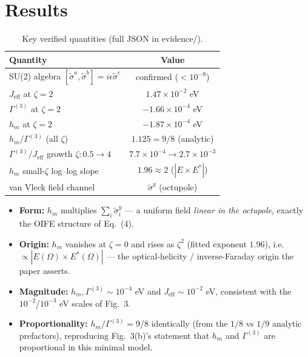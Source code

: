 \documentclass[aps,prb,twocolumn,superscriptaddress,floatfix]{revtex4-2}
\begin{document}
\section{Results}
\begin{table}[h]
\caption{Key verified quantities (full JSON in evidence/).}
\begin{ruledtabular}
\begin{tabular}{lc}
Quantity & Value\\\hline
SU(2) algebra $[\tilde\sigma^a,\tilde\sigma^b]{=}i\epsilon\tilde\sigma^c$ & confirmed ($<10^{-9}$)\\
$J_\mathrm{eff}$ at $\zeta{=}2$ & $1.47\times10^{-2}$ eV\\
$\Gamma^{(3)}$ at $\zeta{=}2$ & $-1.66\times10^{-4}$ eV\\
$h_m$ at $\zeta{=}2$ & $-1.87\times10^{-4}$ eV\\
$h_m/\Gamma^{(3)}$ (all $\zeta$) & $1.125=9/8$ (analytic)\\
$\Gamma^{(3)}/J_\mathrm{eff}$ growth $\zeta:0.5\!\to\!4$ & $7.7\!\times\!10^{-4}\!\to\!2.7\!\times\!10^{-3}$\\
$h_m$ small-$\zeta$ log--log slope & $1.96\approx2$ ($|E\times E^*|$)\\
van Vleck field channel & $\tilde\sigma^y$ (octupole)\\
\end{tabular}
\end{ruledtabular}
\end{table}

\begin{itemize}
\item \textbf{Form:} $h_m$ multiplies $\sum_i\tilde\sigma^y_i$ --- a uniform
field \emph{linear in the octupole}, exactly the OIFE structure of Eq.~(4).
\item \textbf{Origin:} $h_m$ vanishes at $\zeta{=}0$ and rises as $\zeta^2$
(fitted exponent $1.96$), i.e.\ $\propto|E(\Omega)\times E^*(\Omega)|$ ---
the optical-helicity / inverse-Faraday origin the paper asserts.
\item \textbf{Magnitude:} $h_m,\Gamma^{(3)}\sim10^{-4}$ eV and
$J_\mathrm{eff}\sim10^{-2}$ eV, consistent with the $10^{-2}$/$10^{-3}$ eV
scales of Fig.~3.
\item \textbf{Proportionality:} $h_m/\Gamma^{(3)}=9/8$ identically (from the
$1/8$ vs $1/9$ analytic prefactors), reproducing Fig.~3(b)'s statement that
$h_m$ and $\Gamma^{(3)}$ are proportional in this minimal model.
\end{itemize}
\end{document}
